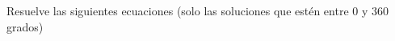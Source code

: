 \documentclass[addpoints,spanish, 12pt,a4paper]{exam}
\begin{document}
\begin{questions}
\question Resuelve las siguientes ecuaciones (solo las soluciones que estén entre 0 y 360 grados) 


\addpoints

\end{questions}
\end{document}

